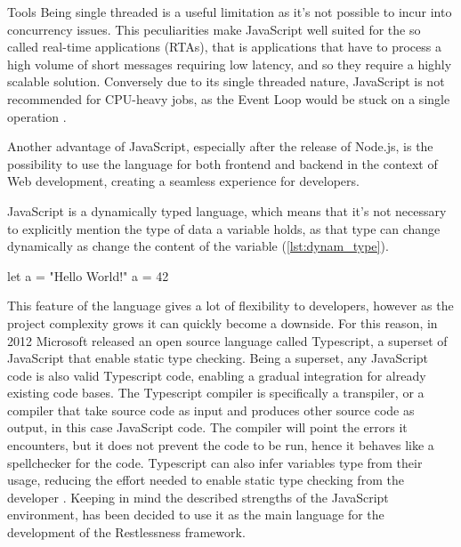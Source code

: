 \begin{chapter}{Tools}
    Being single threaded is a useful limitation as it's not possible to incur
    into concurrency issues.
    This peculiarities make JavaScript well suited for the so called real-time
    applications (RTAs), that is applications that have to process a high volume
    of short messages requiring low latency, and so they require a highly scalable
    solution. Conversely due to its single threaded nature, JavaScript is not
    recommended for CPU-heavy jobs, as the Event Loop would be stuck on a single
    operation \cite{node_event_loop}\cite{node_on_backend}.

    Another advantage of JavaScript, especially after the release of Node.js, is
    the possibility to use the language for both frontend and backend in the context
    of Web development, creating a seamless experience for developers.

    JavaScript is a dynamically typed language, which means that it's not necessary
    to explicitly mention the type of data a variable holds, as that type can change
    dynamically as change the content of the variable (\ref{lst:dynam_type}).

    \begin{code}[caption=Dynamically typed variables, label={lst:dynam_type}]
let a = "Hello World!"
a = 42
    \end{code}

    This feature of the language gives a lot of flexibility to developers, however
    as the project complexity grows it can quickly become a downside.
    For this reason, in 2012 Microsoft released an open source language called
    Typescript, a superset of JavaScript that enable static type checking.
    Being a superset, any JavaScript code is also valid Typescript code, enabling
    a gradual integration for already existing code bases.
    The Typescript compiler is specifically a transpiler, or a compiler that take
    source code as input and produces other source code as output, in this case
    JavaScript code. The compiler will point the errors it encounters, but it does
    not prevent the code to be run, hence it behaves like a spellchecker for the code.
    Typescript can also infer variables type from their usage, reducing the effort
    needed to enable static type checking from the developer
    \cite{typescript_lang}\cite{typescript}.
    Keeping in mind the described strengths of the JavaScript environment, has been
    decided to use it as the main language for the development of the Restlessness
    framework.


\end{chapter}

